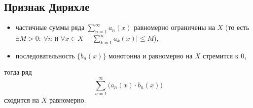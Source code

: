 \subsection{Признак Дирихле}

\begin{theorem}\leavevmode
    \begin{itemize}
        \item частичные суммы ряда $\sum_{n=1}^{\infty}a_n(x)$ равномерно ограничены на $X$ (то есть $\exists M > 0: \ \forall n$ и $\forall x \in X \quad \big|\sum_{k=1}^{n}a_k(x)\big| \leqslant M$),
        \item последовательность $ \big\{b_n(x)\big\} $ монотонна и равномерно на $ X $ стремится к $ 0 $,
    \end{itemize}
    тогда ряд
    \[
        \sum_{n=1}^{\infty}\big(a_n(x) \cdot b_n(x)\big)
    \]
    сходится на $X$ равномерно.
\end{theorem}

